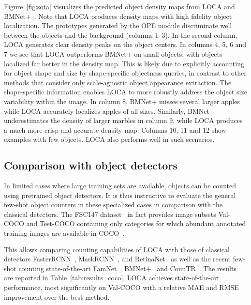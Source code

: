 \documentclass[10pt,twocolumn,letterpaper]{article}
\begin{document}
Figure~\ref{fig:sota} visualizes the predicted object density maps from LOCA and BMNet+~\cite{bmnet}. Note that LOCA produces density maps with high fidelity object localization. The prototypes generated by the OPE module discriminate well between the objects and the background (columns 1--3). In the second column, LOCA generates clear density peaks on the object centers. In columns 4, 5, 6 and 7 we see that LOCA outperforms BMNet+ on small objects, with objects localized far better in the density map. This is likely due to explicitly accounting for object shape and size by shape-specific objectness queries, in contrast to other methods that consider only scale-agnostic object appearance extraction.
The shape-specific information enables LOCA to more robustly address the object size variability within the image. In column 8, BMNet+ misses several larger apples while LOCA accurately localizes apples of all sizes. Similarly, BMNet+ underestimates the density of larger marbles in column 9, while LOCA produces a much more crisp and accurate density map. Columns 10, 11 and 12 show examples with few objects. LOCA also performs well in such scenarios.








\subsection{Comparison with object detectors} 
\label{sec:obj_det}

In limited cases where large training sets are available, objects can be counted using pretrained object detectors.
It is thus instructive to evaluate the general few-shot object counters in these specialized cases in comparison with the classical detectors. The FSC147 dataset~\cite{famnet} in fact provides image subsets Val-COCO and Test-COCO containing only categories for which abundant annotated training images are available in COCO~\cite{cocodata}. 

This allows comparing counting capabilities of LOCA with those of classical detectors FasterRCNN~\cite{fasterrcnn}, MaskRCNN~\cite{maskrcnn}, and RetinaNet~\cite{retinanet} as well as the recent few-shot counting state-of-the-art FamNet~\cite{famnet}, BMNet+~\cite{bmnet} and CounTR~\cite{countr}. The results are reported in Table~\ref{tab:results_coco}. LOCA achieves state-of-the-art performance, most significantly on Val-COCO with a relative  MAE and  RMSE improvement over the best method.
\end{document}
